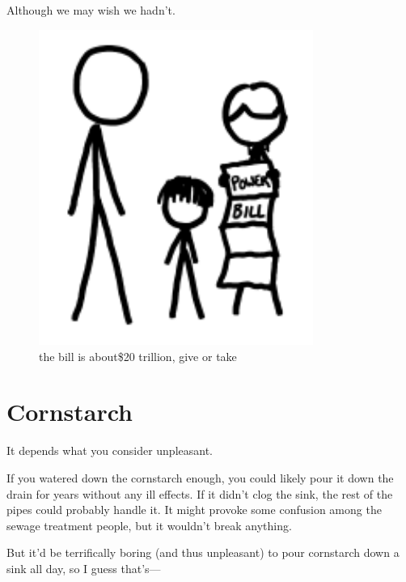 {Although we may wish we hadn't.}

\begin{figure}[!htbp]
\centering
\includegraphics[scale=0.5, max width=0.8\textwidth]{imgs/a/35/hair_dryer_bill.png}
\caption{the bill is about\$20 trillion, give or take}
\end{figure}

{
\chapter{Cornstarch}
}

\hfill{}

{It depends what you consider unpleasant.}

{If you watered down the cornstarch enough, you could likely pour it down the drain for years without any ill effects. If it didn’t clog the sink, the rest of the pipes could probably handle it. It might provoke some confusion among the sewage treatment people, but it wouldn’t break anything.}

{But it’d be terrifically boring (and thus unpleasant) to pour cornstarch down a sink all day, so I guess that’s—}

